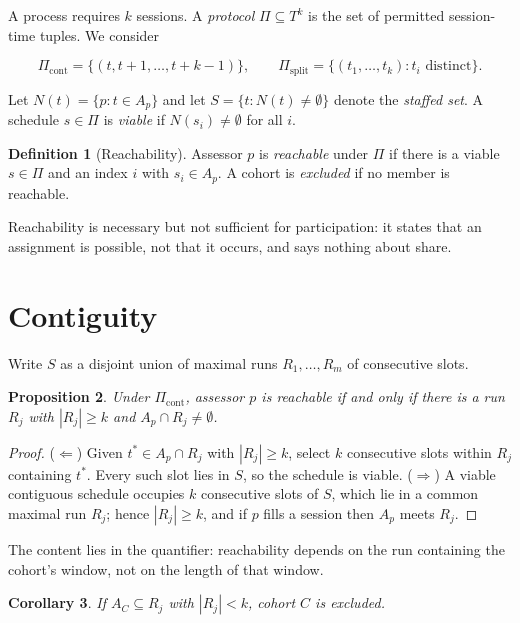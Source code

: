 \documentclass[11pt]{article}
\newtheorem{proposition}{Proposition}
\newtheorem{corollary}[proposition]{Corollary}
\theoremstyle{definition}
\newtheorem{definition}[proposition]{Definition}
\begin{document}
A process requires $k$ sessions. A \emph{protocol} $\Pi \subseteq T^k$ is the set of
permitted session-time tuples. We consider

\[
\Pi_{\mathrm{cont}} = \{(t,t+1,\dots,t+k-1)\},
\qquad
\Pi_{\mathrm{split}} = \{(t_1,\dots,t_k) : t_i \text{ distinct}\}.
\]

Let $N(t)=\{p : t \in A_p\}$ and let $S=\{t : N(t)\neq\emptyset\}$ denote the
\emph{staffed set}. A schedule $s\in\Pi$ is \emph{viable} if $N(s_i)\neq\emptyset$ for
all $i$.

\begin{definition}[Reachability]
Assessor $p$ is \emph{reachable} under $\Pi$ if there is a viable $s\in\Pi$ and an index
$i$ with $s_i \in A_p$. A cohort is \emph{excluded} if no member is reachable.
\end{definition}

Reachability is necessary but not sufficient for participation: it states that an
assignment is possible, not that it occurs, and says nothing about share.

\section{Contiguity}

Write $S$ as a disjoint union of maximal runs $R_1,\dots,R_m$ of consecutive slots.

\begin{proposition}
\label{prop:cont}
Under $\Pi_{\mathrm{cont}}$, assessor $p$ is reachable if and only if there is a run $R_j$
with $|R_j| \ge k$ and $A_p \cap R_j \neq \emptyset$.
\end{proposition}

\begin{proof}
($\Leftarrow$) Given $t^\ast \in A_p \cap R_j$ with $|R_j|\ge k$, select $k$ consecutive
slots within $R_j$ containing $t^\ast$. Every such slot lies in $S$, so the schedule is
viable.
($\Rightarrow$) A viable contiguous schedule occupies $k$ consecutive slots of $S$, which
lie in a common maximal run $R_j$; hence $|R_j|\ge k$, and if $p$ fills a session then
$A_p$ meets $R_j$.
\end{proof}

The content lies in the quantifier: reachability depends on the run containing the
cohort's window, not on the length of that window.

\begin{corollary}
If $A_C \subseteq R_j$ with $|R_j| < k$, cohort $C$ is excluded.
\end{corollary}
\end{document}
